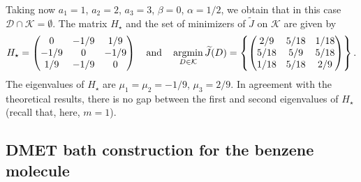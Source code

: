 \documentclass{article}
\newcommand{\1}{{\mathds 1}}
\begin{document}
\medskip

\noindent
Taking now $a_1=1$, $a_2=2$, $a_3=3$, $\beta=0$, $\alpha=1/2$, we obtain that in this case $\mathcal D \cap \mathcal K=\emptyset$. The matrix $H_\star$ and the set of minimizers of $\widetilde J$ on $\mathcal K$ are given by
$$
H_\star =  \begin{pmatrix}
        0 & -1/9 & 1/9 \\ -1/9 & 0 & -1/9 \\ 1/9 & - 1/9 & 0
    \end{pmatrix} \quad  \mbox{and} \quad \mathop{\rm argmin}_{D \in \mathcal K} \widetilde J(D) = \left\{  \begin{pmatrix} 2/9 &  5/18 &  1/18 \\
 5/18 &   5/9 &   5/18 \\
 1/18 &  5/18 &  2/9 \end{pmatrix} \right\}.
$$
The eigenvalues of $H_\star$ are $\mu_1=\mu_2 = -1/9$, $\mu_3=2/9$. In agreement with the theoretical results, there is no gap between the first and second eigenvalues of $H_\star$ (recall that, here, $m=1$).


\subsection{DMET bath construction for the benzene molecule}
\label{sec:molecules}
\end{document}
